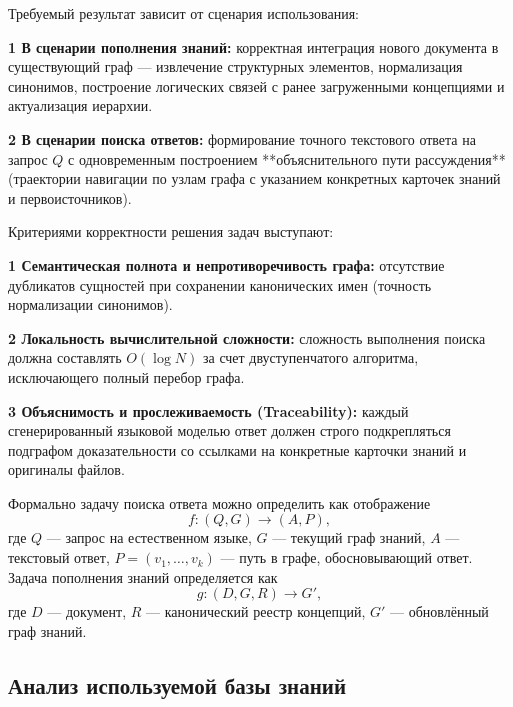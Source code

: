 Требуемый результат зависит от сценария использования:

    \textbf{1 В сценарии пополнения знаний:} корректная интеграция нового документа в существующий граф --- извлечение структурных элементов, нормализация синонимов, построение логических связей с ранее загруженными концепциями и актуализация иерархии.  
    
   \textbf{2 В сценарии поиска ответов:} формирование точного текстового ответа на запрос $Q$ с одновременным построением **объяснительного пути рассуждения** (траектории навигации по узлам графа с указанием конкретных карточек знаний и первоисточников).

Критериями корректности решения задач выступают:

    \textbf{1 Семантическая полнота и непротиворечивость графа:} отсутствие дубликатов сущностей при сохранении канонических имен (точность нормализации синонимов).
    
    \textbf{2 Локальность вычислительной сложности:} сложность выполнения поиска должна составлять $O(\log N)$ за счет двуступенчатого алгоритма, исключающего полный перебор графа.
    
    \textbf{3 Объяснимость и прослеживаемость (Traceability):} каждый сгенерированный языковой моделью ответ должен строго подкрепляться подграфом доказательности со ссылками на конкретные карточки знаний и оригиналы файлов.

Формально задачу поиска ответа можно определить как отображение
\begin{equation}
f: (Q, G) \rightarrow (A, P),
\end{equation}
где $Q$ --- запрос на естественном языке, $G$ --- текущий граф знаний, $A$ --- текстовый ответ, $P = (v_1, \dots, v_k)$ --- путь в графе, обосновывающий ответ. Задача пополнения знаний определяется как
\begin{equation}
g: (D, G, R) \rightarrow G',
\end{equation}
где $D$ --- документ, $R$ --- канонический реестр концепций, $G'$ --- обновлённый граф знаний.


\subsection{Анализ используемой базы знаний}


